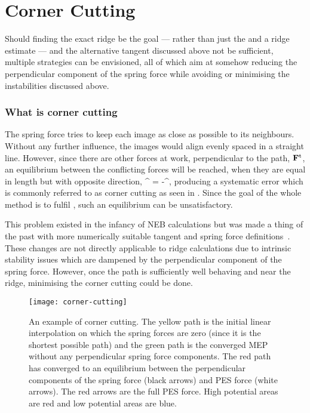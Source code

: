 \section{Corner Cutting}
\label{sec:erm-corner-cutting}
Should finding the exact ridge be the goal --- rather than just the  and a ridge estimate --- and the alternative tangent discussed above not be sufficient, multiple strategies can be envisioned, all of which aim at somehow reducing the perpendicular component of the spring force while avoiding or minimising the instabilities discussed above.

\subsubsection{What is corner cutting}
The spring force tries to keep each image as close as possible to its neighbours.
Without any further influence, the images would align evenly spaced in a straight line.
However, since there are other forces at work, perpendicular to the path, ${\mathrm{\mathbf{\bm{F}}}}^\text{t}$, an equilibrium between the conflicting forces will be reached, when they are equal in length but with opposite direction,
\vF^{\perp} = -\vF^,
\eeq
producing a systematic error which is commonly referred to as corner cutting as seen in .
Since the goal of the whole method is to fulfil , such an equilibrium can be unsatisfactory.

This problem existed in the infancy of NEB calculations but was made a thing of the past with more numerically suitable tangent and spring force definitions~\cite{neb-tangent-2000}.
These changes are not directly applicable to ridge calculations due to intrinsic stability issues which are dampened by the perpendicular component of the spring force.
However, once the path is sufficiently well behaving and near the ridge, minimising the corner cutting could be done.

\begin{SCfigure}[5.0][h]
\centering
\texttt{[image: corner-cutting]}
\caption{
An example of corner cutting.
The yellow path is the initial linear interpolation on which the spring forces are zero (since it is the shortest possible path) and the green path is the converged MEP without any perpendicular spring force components.
The red path has converged to an equilibrium between the perpendicular components of the spring force (black arrows) and PES force (white arrows).
The red arrows are the full PES force.
High potential areas are red and low potential areas are blue.
}
\label{fig:corner-cutting}
\end{SCfigure}

